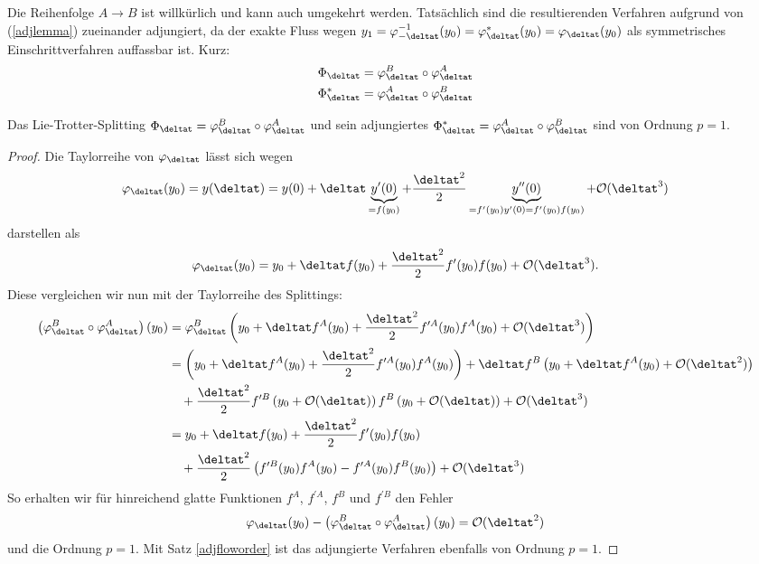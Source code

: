 \hfill%
\begin{minipage}{0.7\textwidth}
Die Reihenfolge $A\to B$ ist willkürlich und kann auch umgekehrt werden. Tatsächlich sind die resultierenden Verfahren aufgrund von (\ref{adjlemma}) zueinander adjungiert, da der exakte Fluss wegen $y_1=\varphi_{-\deltat}^{-1}(y_0)=\varphi_{\deltat}^*(y_0)=\varphi_{\deltat}(y_0)$ als symmetrisches Einschrittverfahren auffassbar ist. Kurz:\\
\begin{align}
\label{liesplittings}
\Phi_{\deltat}=\varphi_{\deltat}^B \circ \varphi_{\deltat}^A\\
\Phi_{\deltat}^*=\varphi_{\deltat}^A \circ \varphi_{\deltat}^B\nonumber
\end{align} 
\end{minipage}

\begin{maththeorem}
\label{lieorder1}
Das Lie-Trotter-Splitting $\Phi_{\deltat}=\varphi_{\deltat}^B \circ \varphi_{\deltat}^A$ und sein adjungiertes $\Phi_{\deltat}^*=\varphi_{\deltat}^A \circ \varphi_{\deltat}^B$ sind von Ordnung $p=1$.
\end{maththeorem}
\begin{proof}
Die Taylorreihe von $\varphi_{\deltat}$ lässt sich wegen 
\[\varphi_{\deltat}(y_0)=y(\deltat)=y(0)+\deltat \underbrace{y^\prime(0)}_{=f(y_0)}
+\frac{\deltat^2}{2}\underbrace{y^{\prime\prime}(0)}_{=f^\prime(y_0)y^\prime(0)=f^\prime(y_0)f(y_0)}+\mathcal{O}(\deltat^3)\] darstellen als 
\[\varphi_{\deltat}(y_0)=y_0+\deltat f(y_0)+\frac{\deltat^2}{2}f^\prime(y_0)f(y_0)+\mathcal{O}(\deltat^3).\]
Diese vergleichen wir nun mit der Taylorreihe des Splittings:
\begin{align*}
\left(\varphi_{\deltat}^B \circ \varphi_{\deltat}^A\right)(y_0)&=
\varphi_{\deltat}^B\left(y_0+\deltat f^A(y_0)+\frac{\deltat^2}{2}f^{\prime A}(y_0)f^A(y_0)+\mathcal{O}(\deltat^3)\right)\\
&=\left(y_0+\deltat f^A(y_0)+\frac{\deltat^2}{2}f^{\prime A}(y_0)f^A(y_0)\right)
+\deltat f^B\left(y_0+\deltat f^A(y_0)+\mathcal{O}(\deltat^2)\right)\\
&\quad+\frac{\deltat^2}{2}f^{\prime B}\left(y_0+\mathcal{O}(\deltat)\right)f^B\left(y_0+\mathcal{O}(\deltat)\right)+\mathcal{O}(\deltat^3)\\
&=y_0+\deltat f(y_0)+\frac{\deltat^2}{2}f^\prime(y_0)f(y_0)\\
&\quad+\frac{\deltat^2}{2}\left(f^{\prime B}(y_0)f^A(y_0)-f^{\prime A}(y_0)f^B(y_0)\right)+\mathcal{O}(\deltat^3)
\end{align*}
So erhalten wir für hinreichend glatte Funktionen $f^A$, $f^{\prime A}$, $f^B$ und $f^{\prime B}$ den Fehler \[\varphi_{\deltat}(y_0)-\left(\varphi_{\deltat}^B \circ \varphi_{\deltat}^A\right)(y_0)=\mathcal{O}(\deltat^2)\] und die Ordnung $p=1$. Mit Satz \ref{adjfloworder} ist das adjungierte Verfahren ebenfalls von Ordnung $p=1$.
\end{proof}

